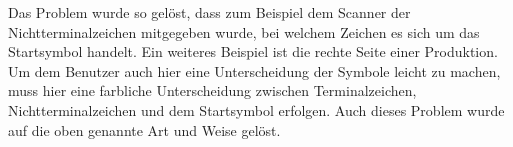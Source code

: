 Das Problem wurde so gelöst, dass zum Beispiel dem Scanner der
Nichtterminalzeichen mitgegeben wurde, bei welchem Zeichen es sich um das
Startsymbol handelt. Ein weiteres Beispiel ist die rechte Seite einer
Produktion. Um dem Benutzer auch hier eine Unterscheidung der Symbole leicht zu
machen, muss hier eine farbliche Unterscheidung zwischen Terminalzeichen,
Nichtterminalzeichen und dem Startsymbol erfolgen. Auch dieses Problem wurde auf
die oben genannte Art und Weise gelöst.
